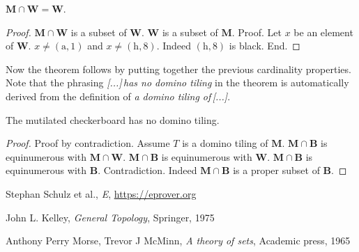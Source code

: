 \documentclass{article}
\newcommand{\fileA}{\mathrm{a}}
\newcommand{\fileH}{\mathrm{h}}
\newcommand{\Mutilated}{\mathbf{M}}
\newcommand{\Black}{\mathbf{B}}
\newcommand{\White}{\mathbf{W}}
\begin{document}
\begin{forthel}
    \begin{lemma}
        $\Mutilated \cap \White = \White$.
    \end{lemma}
    \begin{proof}
        $\Mutilated \cap \White$ is a subset of $\White$.
        $\White$ is a subset of $\Mutilated$.
        Proof.
            Let $x$ be an element of $\White$.
            $x \neq (\fileA, 1)$ and $x \neq (\fileH,8)$.
            Indeed $(\fileH, 8)$ is black.
        End.
    \end{proof}
\end{forthel}

\noindent Now the theorem follows by putting together the previous cardinality properties.
Note that the phrasing \textit{[...]\,has no domino tiling} in the theorem is automatically derived from the definition of \textit{a domino tiling of\,[...]}.

\begin{forthel}
    \begin{theorem}
        The mutilated checkerboard has no domino tiling.
    \end{theorem}
    \begin{proof}
        Proof by contradiction.
        Assume $T$ is a domino tiling of $\Mutilated$.
        $\Mutilated \cap \Black$ is equinumerous with $\Mutilated \cap \White$.
        $\Mutilated \cap \Black$ is equinumerous with $\White$.
        $\Mutilated \cap \Black$ is equinumerous with $\Black$.
        Contradiction. Indeed $\Mutilated \cap \Black$ is a proper subset of $\Black$.
    \end{proof}
\end{forthel}

\begin{thebibliography}{1}

 Stephan Schulz et al., \textit{E}, \url{https://eprover.org}

 John L. Kelley, \textit{General Topology}, Springer, 1975

 Anthony Perry Morse, Trevor J McMinn, \textit{A theory of sets}, Academic press, 1965

\end{thebibliography}
\end{document}
